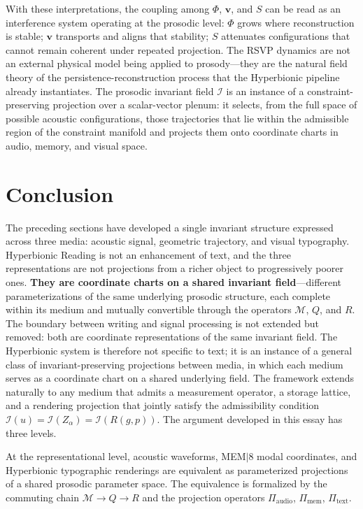 \documentclass[12pt, a4paper]{article}
\newcommand{\hyperstrong}[1]{\textbf{\Large #1}}
\begin{document}
With these interpretations, the coupling among $\Phi$, $\mathbf{v}$, and $S$ can be read as an interference system operating at the prosodic level: $\Phi$ grows where reconstruction is stable; $\mathbf{v}$ transports and aligns that stability; $S$ attenuates configurations that cannot remain coherent under repeated projection. The RSVP dynamics are not an external physical model being applied to prosody---they are the natural field theory of the persistence-reconstruction process that the Hyperbionic pipeline already instantiates. The prosodic invariant field $\mathcal{I}$ is an instance of a constraint-preserving projection over a scalar-vector plenum: it selects, from the full space of possible acoustic configurations, those trajectories that lie within the admissible region of the constraint manifold and projects them onto coordinate charts in audio, memory, and visual space.


\section{Conclusion}

The preceding sections have developed a single invariant structure expressed across three media: acoustic signal, geometric trajectory, and visual typography. Hyperbionic Reading is not an enhancement of text, and the three representations are not projections from a richer object to progressively poorer ones. \hyperstrong{They are coordinate charts on a shared invariant field}---different parameterizations of the same underlying prosodic structure, each complete within its medium and mutually convertible through the operators $\mathcal{M}$, $Q$, and $R$. The boundary between writing and signal processing is not extended but removed: both are coordinate representations of the same invariant field. The Hyperbionic system is therefore not specific to text; it is an instance of a general class of invariant-preserving projections between media, in which each medium serves as a coordinate chart on a shared underlying field. The framework extends naturally to any medium that admits a measurement operator, a storage lattice, and a rendering projection that jointly satisfy the admissibility condition $\mathcal{I}(u) = \mathcal{I}(Z_\alpha) = \mathcal{I}(R(g,p))$. The argument developed in this essay has three levels.

At the representational level, acoustic waveforms, MEM$|$8 modal coordinates, and Hyperbionic typographic renderings are equivalent as parameterized projections of a shared prosodic parameter space. The equivalence is formalized by the commuting chain $\mathcal{M} \to Q \to R$ and the projection operators $\Pi_{\mathrm{audio}}$, $\Pi_{\mathrm{mem}}$, $\Pi_{\mathrm{text}}$.
\end{document}
